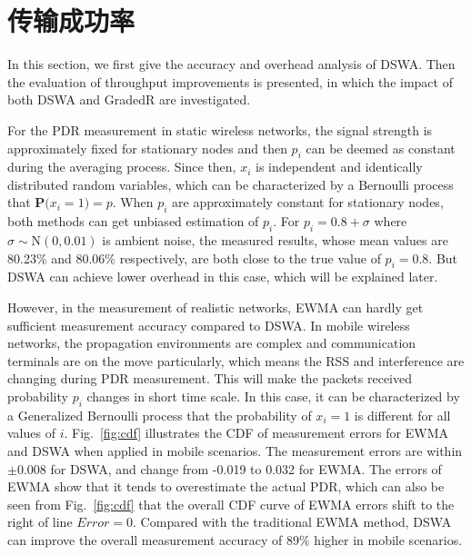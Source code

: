 \begin{figure}[!htp]
\centering
\hspace{1in}
\centering
\end{figure}

\section{传输成功率}
\label{sec:pdr}

In this section, we first give the accuracy and overhead analysis of DSWA. Then the evaluation of throughput improvements is presented, in which the impact of both DSWA and GradedR are investigated.

For the PDR measurement in static wireless networks, the signal strength is approximately fixed for stationary nodes \cite{reis2006model} and then $p_i$ can be deemed as constant during the averaging process. Since then, $x_i$ is independent and identically distributed random variables, which can be characterized by a Bernoulli process that $\textbf{P(}x_i=1\textbf{)}=p$. When $p_i$ are approximately constant for stationary nodes, both methods can get unbiased estimation of $p_i$. For $p_i=0.8+\sigma$ where $\sigma\sim \textrm{N}(0,0.01)$ is ambient noise, the measured results, whose mean values are 80.23\% and 80.06\% respectively, are both close to the true value of $p_i=0.8$. But DSWA can achieve lower overhead in this case, which will be explained later.

However, in the measurement of realistic networks, EWMA can hardly get sufficient measurement accuracy compared to DSWA. In mobile wireless networks, the propagation environments are complex and communication terminals are on the move particularly, which means the RSS and interference are changing during PDR measurement. This will make the packets received probability $p_i$ changes in short time scale. In this case, it can be characterized by a Generalized Bernoulli process that the probability of $x_i=1$ is different for all values of $i$.
Fig.~\ref{fig:cdf} illustrates the CDF of measurement errors for EWMA and DSWA when applied in mobile scenarios. The measurement errors are within $\pm$0.008 for DSWA, and change from -0.019 to 0.032 for EWMA. The errors of EWMA show that it tends to overestimate the actual PDR, which can also be seen from Fig.~\ref{fig:cdf} that the overall CDF curve of EWMA errors shift to the right of line $Error=0$. Compared with the traditional EWMA method, DSWA can improve the overall measurement accuracy of 89\% higher in mobile scenarios.

